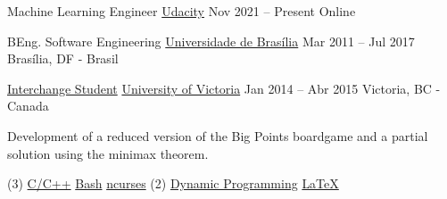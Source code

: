 \par
{}

\cveducation
{Machine Learning Engineer}
{\href{https://www.udacity.com/course/machine-learning-engineer-nanodegree--nd009t}{Udacity}}
{Nov 2021 -- Present}
{Online}

\bigskip

\cveducation
{BEng. Software Engineering}
{\href{https://fga.unb.br/software}{Universidade de Brasília}}
{Mar 2011 -- Jul 2017}
{Brasília, DF - Brasil}

\smallskip

\cveducation
{\footnotesize\faExchange\hspace{0.7em}\small\mdseries\href{http://www.cienciasemfronteiras.gov.br/web/csf/o-programa}{Interchange Student}}
{\href{https://www.uvic.ca/}{University of Victoria}}
{Jan 2014 -- Abr 2015}
{Victoria, BC - Canada}
\smallskip


\bigskip



{\smallskip\justifying
	{\faAngleRight} {\color{description}Development of a reduced version of the Big Points boardgame and a partial solution using the minimax theorem.}
\par}

\vspace{-0.5mm}
\begin{tasks}[after-item-skip=-0.5mm, label-offset=0.5mm, item-indent=5.0mm, label-align=left, label={\scriptsize\faCode}, label-format={\scriptsize\color{tech}}, item-format={\bfseries\footnotesize\color{emphasis}}](3)
	\task \href{https://www.cplusplus.com/}{C/C++}
	\task \href{https://www.gnu.org/software/bash/}{Bash}
	\task \href{https://invisible-island.net/ncurses/announce.html}{ncurses}
	\task*(2) \href{https://en.wikipedia.org/wiki/Dynamic_programming}{Dynamic Programming}
	\task \href{http://www.scrummanifesto.org/}{\LaTeX}
\end{tasks}

\bigskip

